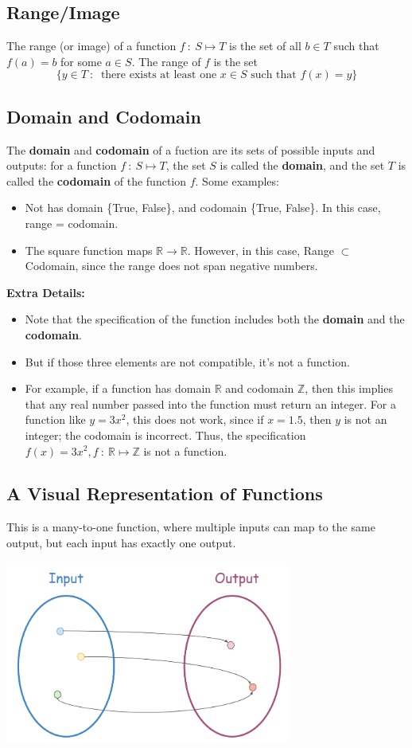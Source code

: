 \documentclass[10pt]{article}
\begin{document}
\subsection*{Range/Image}
The range (or image) of a function $f \::\: S \mapsto T$ is the set of all $b \in T$ such that $f(a) = b$ for some $a \in S$.  The range of $f$ is the set
\[\{y \in T \::\: \text{ there exists at least one $x \in S$ such that $f(x) = y$}\}\]

\subsection*{Domain and Codomain}
The \textbf{domain} and \textbf{codomain} of a fuction are its sets of possible inputs and outputs:  for a function $f \::\: S \mapsto T$, the set $S$ is called the \textbf{domain}, and the set $T$ is called the \textbf{codomain} of the function $f$.  Some examples:
\begin{itemize}
	\item Not has domain \{True, False\}, and codomain \{True, False\}.  In this case, range = codomain.
	\item The square function maps $\mathbb{R} \rightarrow \mathbb{R}$.  However, in this case, Range $\subset$ Codomain, since the range does not span negative numbers.
\end{itemize}
\textbf{Extra Details:}
\begin{itemize}
	\item Note that the specification of the function includes both the \textbf{domain} and the \textbf{codomain}.
	\item But if those three elements are not compatible, it's not a function.
	\item For example, if a function has domain $\mathbb{R}$ and codomain $\mathbb{Z}$, then this implies that any real number passed into the function must return an integer.  For a function like $y = 3x^2$, this does not work, since if $x = 1.5$, then $y$ is not an integer; the codomain is incorrect.  Thus, the specification $f(x) = 3x^2, f\::\: \mathbb{R} \mapsto \mathbb{Z}$ is not a function.
\end{itemize}

\subsection*{A Visual Representation of Functions}
This is a many-to-one function, where multiple inputs can map to the same output, but each input has exactly one output.
\begin{center} 
	\includegraphics*[width=0.7\textwidth]{M2_5.png} 
\end{center}
\end{document}
